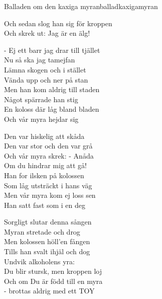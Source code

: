 \begin{song}{Balladen om den kaxiga myran}{balladkaxigamyran}
\begin{vers}
Och sedan slog han sig för kroppen\\
\repopen Och skrek ut: Jag är en älg! \repclose\\
\end{vers}
\begin{vers}
- Ej ett barr jag drar till tjället\\
Nu så ska jag tamejfan\\
Lämna skogen och i stället\\
Vända upp och ner på stan\\
Men han kom aldrig till staden\\
Något spärrade han stig\\
En koloss där låg bland bladen\\
\repopen Och vår myra hejdar sig \repclose\\
\end{vers}
\begin{vers}
Den var hiskelig att skåda\\
Den var stor och den var grå\\
Och vår myra skrek: - Anåda\\
Om du hindrar mig att gå!\\
Han for ilsken på kolossen\\
Som låg utsträckt i hans väg\\
Men vår myra kom ej loss sen\\
\repopen Han satt fast som i en deg \repclose\\
\end{vers}

\newp

\begin{vers}
Sorgligt slutar denna sången\\
Myran stretade och drog\\
Men kolossen höll'en fången\\
Tills han svalt ihjäl och dog\\
Undvik alkoholens yra:\\
Du blir stursk, men kroppen loj\\
Och om Du är född till en myra\\
\repopen - brottas aldrig med ett TOY \repclose\\
\end{vers}
\end{song}
